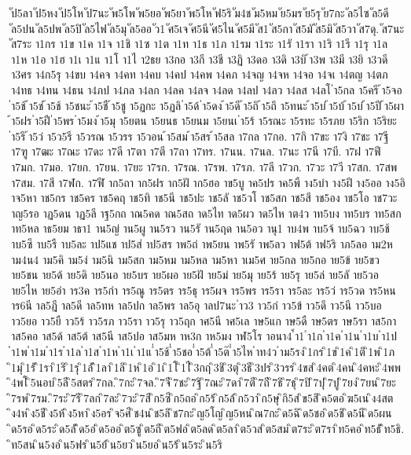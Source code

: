 {{ัป5ลา
ัป5หง
ัป5โห
ัป7นะ
ัพ5โพ
ัพ5ยอ
ัพ5ยา
ัพ5โห
ัฟ5ริ
ัม4ช
ัม5หม
ัย5มร
ัย5รุ
ัย7กะ
ัล5ไซ
ัล5ดี
ัล5ปน
ัล5ปพ
ัล5ปิ
ัล5ไฟ
ัล5มุ
ัล5ออ
ัว1
ัศ5เจ
ัศ5นี
ัศ5ไน
ัศ5มี
ัส1
ัส5กา
ัส5มั
ัส5มิ
ัส5วา
ัส7ดุ.
ัส7นะ
ัส7ระ
า1กร
า1ข
า1ค
า1จ
า1ชิ
า1ซ
า1ต
า1ท
า1ธ
า1ภ
า1รม
า1ระ
า1รั
า1รา
า1ริ
า1รี
า1รุ
า1ล
า1ห
า1อ
า1ฮ
า1เ
า1แ
า1โ
า1ไ
า2ธย
า3กอ
า3กี
า3ชี
า3ฏิ
า3ดอ
า3ดิ
า3บิ
้า3พ
า3มี
า3ยิ
า3วดี
า3ศร
า4ก5รุ
า4ขบ
า4คจ
า4คท
า4คบ
า4คป
า4คพ
า4คภ
า4จญ
า4จห
า4จอ
า4จเ
า4ตญ
า4ตภ
า4ทธ
า4ทน
า4ธน
า4ภป
า4ภล
า4ลก
า4ลค
า4ลจ
า4ลด
า4ลป
า4ลว
า4ลส
า4ลโ
่า5กล
า5ครี
้า5จอ
่า5ช้
้า5ช่
้า5ช้
า5ชนะ
้า5ชื
้า5ชู
า5ฏกะ
า5ฏลิ
่า5ด้
่า5ดง
้า5ดี
้า5ถิ
้า5ถึ
า5ทนะ
้า5บ่
้า5บ้
้า5บ๋
้า5ปี
้า5ผา
้า5ฝร
่า5ฝื
่า5พร
่า5มง
้า5มุ
า5ยตน
า5ยนธ
า5ยนม
า5ยนเ
่า5ร้
า5รณะ
า5รทะ
า5รภย
า5ริก
า5ริยะ
่า5รึ
้า5ว่
า5ว5รี
า5วรณ
า5วรร
า5วอน
้า5สม
้า5สร
้า5สล
า7กล
า7กอ.
า7กิ
า7ขะ
า7งิ
า7ชะ
า7ฐี
า7ฑู
า7ฒะ
า7ณะ
า7ดะ
า7ดี
า7ตา
า7ตี
า7ถา
า7ทร.
า7นน.
า7นล.
า7นะ
า7นี
า7บี.
า7ฝ
า7ฟี
า7มก.
า7มอ.
า7ยก.
า7ยน.
า7ยะ
า7รก.
า7รณ.
า7รพ.
า7รภ.
า7ลี
า7วก.
า7วะ
า7วี
า7สก.
า7สพ
า7สม.
า7สี
า7ฬก.
า7ฬี
าก5ถา
าก5ฝร
าก5ฝั
าก5ฮอ
าข5บู
าค5ปร
าค5พื
าง5บำ
าง5ฝี
าง5ออ
าง5อิ
าจ5หา
าช5กร
าช5คร
าช5คฤ
าช5ทิ
าช5นี
าช5ปะ
าช5ลั
าช5วโ
าช5สก
าช5สี
าช5อง
าช5โอ
าช7วะ
าญ5รอ
าฏ5ดน
าฏ5ลี
าฐ5กถ
าณ5คด
าณ5สถ
าด5ไท
าด5ผว
าด5ไห
าต4ว
าท5บง
าท5บร
าท5สก
าท5หล
าธ5ยม
าธา1
าน5ญ่
าน5ผู
าน5รว
าน5รั
าน5ฤด
าน5อว
านุ1
าบ4พ
าบ5จ้
าบ5ฉว
าบ5ช้
าบ5ซึ
าบ5รื
าบ5ละ
าป5แช
าป5ส่
าป5สร
าพ5ถ่
าพ5ยน
าพ5รั
าพ5ลว
าฟ5ต้
าฟ5ริ
าภ5ลอ
าม2ห
าม4น4
าม5คิ
าม5ง่
าม5นิ
าม5สก
าม5หม
าม5หล
าม5หา
าเม5ศ
าย5กล
าย5กอ
าย5ข้
าย5ขว
าย5ชน
าย5ด้
าย5ดิ
าย5นอ
าย5บร
าย5ผอ
าย5ฝั
าย5ม่
าย5มุ
าย5ร้
าย5รุ
าย5ล่
าย5ลั
าย5วอ
าย5ไห
าย5อำ
าร3ค
าร5กำ
าร5ณู
าร5ตร
าร5ธุ
าร5ผจ
าร5พร
าร5รา
าร5ละ
าร5ว่
าร5วด
าร5หน
าร6นี
าล5ฎี
าล5ดี
าล5ทห
าล5ปก
าล5พร
าล5อุ
าลป7นะ
่าว3
าว5ก่
าว5ข้
าว5ดึ
าว5นี
าว5บอ
าว5ยอ
าว5ยื
าว5ร้
าว5รภ
าว5รา
าว5รุ
าว5ฤก
าศ5นี
าศ5เล
าษ5แก
าษ5ดื
าษ5ตร
าษ5รา
าส5กา
าส5คอ
าส5ด้
าส5ต้
าส5นี
าส5ปอ
าส5มห
าห3ก
าห5มง
าฬ5โร
าอนา4
้ำ1
ำ1ก
ำ1ค
ำ1น
ำ1บ
ำ1ป
ำ1พ
ำ1ม
ำ1ร
ำ1ล
ำ1ส
ำ1ห
ำ1เ
ำ1แ
่ำ5ช้
่ำ5ชอ
่ำ5ต้
่ำ5ต๊
่ำ5ไห
ำท4ว
ำม5รง
ิ1กร
ิ1ข
ิ1ค
ิ1ติ
ิ1พ
ิ1ภ
ิ1มุ
ิ1รั
ิ1รา
ิ1ริ
ิ1รุ
ิ1ลั
ิ1ลา
ิ1ลิ
ิ1ห
ิ1อ
ิ1เ
ิ1โ
ิ1ไ
ิ3กฤ
ิ3ชิ
ิ3ตุ
ิ3ธี
ิ3ปร
ิ3วรร
ิ4ขส
ิ4คต
ิ4คน
ิ4คหะ
ิ4พพ
ิ4พโ
ิ5นอบ
ิ5ลี
ิ5สตร
ิ7กล.
ิ7กะ
ิ7จล.
ิ7จี
ิ7ชะ
ิ7ฐิ
ิ7ณะ
ิ7ดา
ิ7ตี
ิ7ถี
ิ7ธิ
ิ7ธุ
ิ7ปิ
ิ7ปุ
ิ7ปู
ิ7ยง
ิ7ยน
ิ7ยะ
ิ7รพ
ิ7รม.
ิ7ระ
ิ7รี
ิ7ลก
ิ7ละ
ิ7วะ
ิ7สี
ิก5ซี
ิก5ถอ
ิก5ร้
ิก5ล้
ิก5วา
ิก5ษุ
ิกิ5ส
ิข5สิ
ิค5ตอ
ิฆ5เน
ิง4สต
ิง4ห
ิง5ชี
ิง5ห้
ิง5หา
ิง5อร
ิจ5ศี
ิช4น
ิช5ลิ
ิช7กะ
ิญ5โญ
ิญ5หน
ิณ7กะ
ิด5ฉิ
ิด5ชอ
ิด5ชิ
ิด5นี
ิด5ผน
ิด5รอ
ิด5ระ
ิด5ลั
ิด5อ่
ิด5ออ
ิต5ซู
ิต5ถี
ิต5ฟอ
ิต5ลด
ิต5ลา
ิต5วส
ิต5สม
ิต7ระ
ิต7รา
ิท5คอ
ิท5ธั
ิท5ธิ.
ิท5สน
ิน5งอ
ิน5ฟร
ิน5ย้
ิน5ยว
ิน5ยอ
ิน5ร้
ิน5ระ
ิน5ริ
}}
